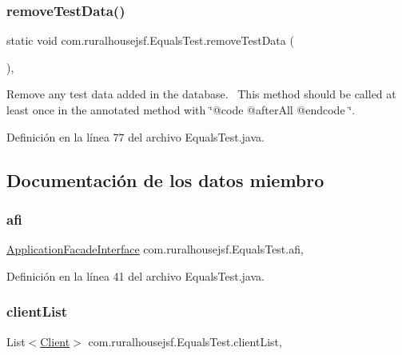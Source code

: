 \subsubsection{\texorpdfstring{removeTestData()}{removeTestData()}}
{\footnotesize\ttfamily static void com.\+ruralhousejsf.\+Equals\+Test.\+remove\+Test\+Data (\begin{DoxyParamCaption}{ }\end{DoxyParamCaption})\hspace{0.3cm}{\ttfamily [static]}, {\ttfamily [private]}}

Remove any test data added in the database.~\newline
 This method should be called at least once in the annotated method with \char`\"{}@code @after\+All @endcode \char`\"{}. 

Definición en la línea 77 del archivo Equals\+Test.\+java.



\subsection{Documentación de los datos miembro}
\mbox{\label{classcom_1_1ruralhousejsf_1_1_equals_test_a51e738cac64499dfd6d290d8f70ec8ce}} 
\subsubsection{\texorpdfstring{afi}{afi}}
{\footnotesize\ttfamily \mbox{\hyperlink{interfacecom_1_1ruralhousejsf_1_1business_logic_1_1_application_facade_interface}{Application\+Facade\+Interface}} com.\+ruralhousejsf.\+Equals\+Test.\+afi\hspace{0.3cm}{\ttfamily [static]}, {\ttfamily [package]}}



Definición en la línea 41 del archivo Equals\+Test.\+java.

\mbox{\label{classcom_1_1ruralhousejsf_1_1_equals_test_a313faa108d9cc5b97c40bf50af089c87}} 
\subsubsection{\texorpdfstring{clientList}{clientList}}
{\footnotesize\ttfamily List$<$\mbox{\hyperlink{classcom_1_1ruralhousejsf_1_1domain_1_1_client}{Client}}$>$ com.\+ruralhousejsf.\+Equals\+Test.\+client\+List\hspace{0.3cm}{\ttfamily [static]}, {\ttfamily [package]}}



